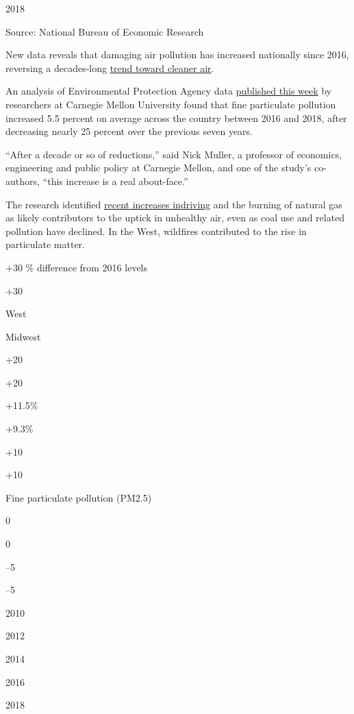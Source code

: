 2018

Source: National Bureau of Economic Research

New data reveals that damaging air pollution has increased nationally
since 2016, reversing a decades-long
\href{https://www.nytimes3xbfgragh.onion/interactive/2019/06/19/climate/us-air-pollution-trump.html}{trend
toward cleaner air}.

An analysis of Environmental Protection Agency data
\href{https://www.nber.org/papers/w26381}{published this week} by
researchers at Carnegie Mellon University found that fine particulate
pollution increased 5.5 percent on average across the country between
2016 and 2018, after decreasing nearly 25 percent over the previous
seven years.

``After a decade or so of reductions,'' said Nick Muller, a professor of
economics, engineering and public policy at Carnegie Mellon, and one of
the study's co-authors, ``this increase is a real about-face.''

The research identified
\href{https://www.nytimes3xbfgragh.onion/interactive/2019/10/10/climate/driving-emissions-map.html?rref=collection\%2Fbyline\%2Fnadja-popovich}{recent
increases
in}\href{https://www.nytimes3xbfgragh.onion/interactive/2019/10/10/climate/driving-emissions-map.html?rref=collection\%2Fbyline\%2Fnadja-popovich}{driving}
and the burning of natural gas as likely contributors to the uptick in
unhealthy air, even as coal use and related pollution have declined. In
the West, wildfires contributed to the rise in particulate matter.

+30 \% difference from 2016 levels

+30

West

Midwest

+20

+20

+11.5\%

+9.3\%

+10

+10

Fine particulate pollution (PM2.5)

0

0

­--5

­--5

2010

2012

2014

2016

2018

